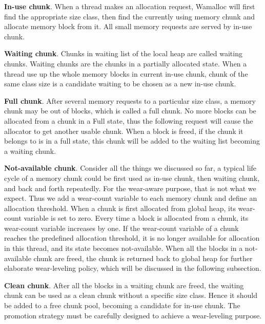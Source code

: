 \documentclass[10pt, conference, compsocconf]{IEEEtran}
\begin{document}
\textbf{In-use chunk}. 
When a thread makes an allocation request, 
Wamalloc will first find the appropriate size class, 
then find the currently using memory chunk and allocate memory block from it.
All small memory requests are served by in-use chunk.

\textbf{Waiting chunk}. 
Chunks in waiting list of the local heap are called waiting chunks. 
Waiting chunks are the chunks in a partially allocated state. 
When a thread use up the whole memory blocks in current in-use chunk,
chunk of the same class size is a candidate waiting to be chosen as a new in-use chunk.

\textbf{Full chunk}. 
After several memory requests to a particular size class, 
a memory chunk may be out of blocks, which is called a full chunk.
No more blocks can be allocated from a chunk in a Full state, 
thus the following request will cause the allocator to get another usable chunk.
When a block is freed, if the chunk it belongs to is in a full state, 
this chunk will be added to the waiting list becoming a waiting chunk.

\textbf{Not-available chunk}.
Consider all the things we discussed so far, 
a typical life cycle of a memory chunk could be first used as in-use chunk, then waiting chunk, and back and forth repeatedly. 
For the wear-aware purpose, that is not what we expect. 
Thus we add a wear-count variable to each memory chunk and define an allocation threshold. 
When a chunk is first allocated from global heap, its wear-count variable is set to zero.
Every time a block is allocated from a chunk, its wear-count variable increases by one. 
If the wear-count variable of a chunk reaches the predefined allocation threshold, 
it is no longer available for allocation in this thread, and its state becomes not-available. 
When all the blocks in a not-available chunk are freed,
the chunk is returned back to global heap for further elaborate wear-leveling policy, 
which will be discussed in the following subsection.

\textbf{Clean chunk}.
After all the blocks in a waiting chunk are freed, 
the waiting chunk can be used as a clean chunk without a specific size class.
Hence it should be added to a free chunk pool, becoming a candidate for in-use chunk.
The promotion strategy must be carefully designed to achieve a wear-leveling purpose.

\end{document}
